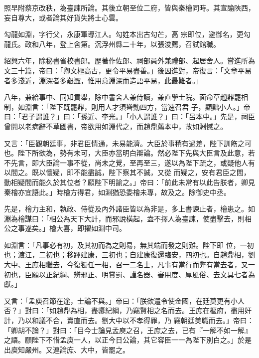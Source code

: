 \begin{pinyinscope}
 照早附蔡京改秩，為臺諫所論。其後立朝至位二府，皆與秦檜同時。其宣諭陜西，妄自尊大，或者論其好貨失將士心雲。



 勾龍如淵，字行父，永康軍導江人。勾姓本出古勾芒，高
 宗即位，避御名，更勾龍氏。政和八年，登上舍第。沉浮州縣二十年，以張浚薦，召試館職。



 紹興六年，除秘書省校書郎。歷著作佐郎、祠部員外兼禮部、起居舍人。嘗進所為文三十篇，帝曰：「卿文極高古，更令平易盡善。」後因進對，帝復言：「文章平易者多淺近，淵深者多艱澀，惟用意淵深而造語平易，此最難者。」



 八年，兼給事中、同知貢舉，除中書舍人兼侍讀，兼直學士院。面命草趙鼎罷相制，如淵言：「陛下既罷鼎，則用人才須聳動四方，當速召君
 子，顯黜小人。」帝曰：「君子謂誰？」曰：「孫近、李光。」「小人謂誰？」曰：「呂本中。」先是，祠臣曾開以老病辭不草國書，帝欲用如淵代之，而趙鼎薦本中，故如淵憾之。



 又言：「臣觀朝廷事，非君臣情通，未易能濟。大臣於事稍有過差，陛下訓飭之可也。陛下所欲為，勢有未可，大臣亦當明白辯論。然必陛下先與大臣言及此意，若不先言，即大臣論一事不從，尚未之覺，至再至三，遂以為陛下疏之，或疑他人有以間之。既以懷疑，即不能盡誠，陛下察其不誠，又從
 而疑之，安有君臣之間，動相疑間而能久於其位者？願陛下明諭之。」帝曰：「前此未常有以此告朕者，卿見秦檜亦宜語此。」時檜方得君，如淵猶恐委檜未專，故及之。除御史中丞。



 先是，檜力主和，執政、侍從及內外諸臣皆以為非是，多上書諫止者，檜患之。如淵為檜謀曰：「相公為天下大計，而邪說橫起，盍不擇人為臺諫，使盡擊去，則相公之事遂矣。」檜大喜，即擢如淵中司。



 如淵言：「凡事必有初，及其初而為之則易，無其端而發之則難。陛下即
 位，一初也；渡江，二初也；移蹕建康，三初也；自建康復還臨安，四初也。自趙鼎相，劉大中、王庶相繼去，今復獨任一相，召一二名士，凡事有當行而弊有當去者，又一初也，臣願以正紀綱、辨邪正、明賞罰、謹名器、審用度、厚風俗、去文具七者為獻。」



 又言：「孟庾召節在途，士論不與。」帝曰：「朕欲遣令使金國，在廷莫更有小人否？」對曰：「如趙鼎為相，盡隳紀綱，乃竊賢相之名而去。王庶在樞府，盡用奸計，乃以和議不合，賣直而去。劉大中以不孝得罪，乃
 竊朝廷美職而去。」帝曰：「卿胡不論？」對曰：「目今士論見孟庾之召，王庶之去，已有『一解不如一解』之語。願陛下不惜孟庾一人，以正今日公論，其它容臣一一為陛下別白之。」於是出庾知嚴州。又連論庶、大中，皆罷之。




\end{pinyinscope}
